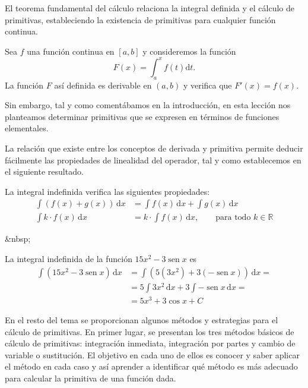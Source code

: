 El teorema fundamental del cálculo relaciona la integral definida y el cálculo de primitivas, estableciendo la existencia de primitivas para cualquier función continua.

\begin{teorema}\label{teo:fundcalc}
Sea $f$ una función continua en $[a,b]$ y consideremos la función
\[
F(x)=\int_a^xf(t)\mathrm dt.
\]
La función $F$ así definida es derivable en $(a,b)$ y verifica que $F'(x)=f(x)$.
\end{teorema}
%
Sin embargo, tal y como comentábamos en la introducción, en esta lección nos planteamos determinar primitivas que se expresen en términos de funciones elementales.

La relación que existe entre los conceptos de derivada y primitiva permite deducir fácilmente las propiedades de linealidad del operador, tal y como establecemos en el siguiente resultado.
%
\begin{proposicion} 
La integral indefinida verifica las siguientes propiedades:
\begin{align*}
\displaystyle\int (f(x)+g(x))\,\mathrm dx  &= \displaystyle\int f(x)\,\mathrm dx + \displaystyle\int g(x)\,\mathrm dx \\
\displaystyle\int k \cdot f(x)\,\mathrm dx &= k\cdot\displaystyle\int f(x)\,\mathrm dx,\qquad\text{para todo } k\in\mathbb{R}
\end{align*}
\end{proposicion}
\begin{rawhtml}
&nbsp;
\end{rawhtml}
\begin{ejemplo}\label{ej:int-lineal1}
La integral indefinida de la función $15x^2-3\operatorname{sen} x$ es
\begin{align*}
\displaystyle\int(15x^2-3\operatorname{sen} x)\,\mathrm dx &= \displaystyle\int\left(5(3x^2)+3(-\operatorname{sen} x)\right)\,\mathrm dx = \\
&= 5 \displaystyle\int 3x^2\,\mathrm dx+3\displaystyle\int-\operatorname{sen} x\,\mathrm dx =\\
&= 5x^3+3\cos x + C \tag*{\fej}
\end{align*}
\end{ejemplo}

En el resto del tema se proporcionan algunos métodos y estrategias para el cálculo de primitivas.
En primer lugar, se presentan los tres métodos básicos de cálculo de primitivas: integración inmediata, integración por partes y cambio de variable o sustitución.
El objetivo en cada uno de ellos es conocer y saber aplicar el método en cada caso y así aprender a identificar qué método es más adecuado para calcular la primitiva de una función dada.

